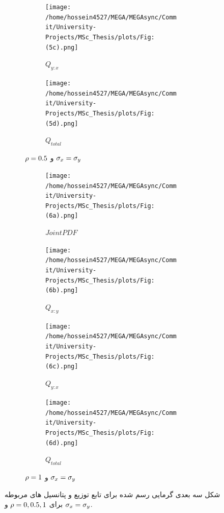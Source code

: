 \documentclass[a4paper,titlepage,12pt,fleqn,oneside]{report}
\begin{document}
\begin{figure}[tbp]
\begin{subfigure}[b]{\textwidth}
  		\hfill
  		\begin{subfigure}[b]{0.24\textwidth}
  			\renewcommand\thesubfigure{iii}
  			\centering
  			\texttt{[image: /home/hossein4527/MEGA/MEGAsync/Commit/University-Projects/MSc\_Thesis/plots/Fig:(5c).png]}
  			\caption{$Q_{y:x}$}
  			\label{fig:2.2.3}
  		\end{subfigure}
  		\hfill
  		\begin{subfigure}[b]{0.24\textwidth}
  			\renewcommand\thesubfigure{iv}
  			\centering
  			\texttt{[image: /home/hossein4527/MEGA/MEGAsync/Commit/University-Projects/MSc\_Thesis/plots/Fig:(5d).png]}
  			\caption{$Q_{total}$}
  			\label{fig:2.2.4}
  		\end{subfigure}
  		\caption{$\protect\rho =0.5$ و $\protect\sigma _{x}=\protect\sigma _{y}$}
  		\label{fig:2.2}
  	\end{subfigure}
  	\begin{subfigure}[b]{\textwidth}
  		\renewcommand\thesubfigure{c}
  		\begin{subfigure}[b]{0.24\textwidth}
  			\renewcommand\thesubfigure{i}
  			\centering
  			\texttt{[image: /home/hossein4527/MEGA/MEGAsync/Commit/University-Projects/MSc\_Thesis/plots/Fig:(6a).png]}
  			\caption{$Joint PDF$}
  			\label{fig:2.3.1}
  		\end{subfigure}
  		\hfill
  		\begin{subfigure}[b]{0.24\textwidth}
  			\renewcommand\thesubfigure{ii}
  			\centering
  			\texttt{[image: /home/hossein4527/MEGA/MEGAsync/Commit/University-Projects/MSc\_Thesis/plots/Fig:(6b).png]}
  			\caption{$Q_{x:y}$}
  			\label{fig:2.3.2}
  		\end{subfigure}
  		\hfill
  		\begin{subfigure}[b]{0.24\textwidth}
  			\renewcommand\thesubfigure{iii}
  			\centering
  			\texttt{[image: /home/hossein4527/MEGA/MEGAsync/Commit/University-Projects/MSc\_Thesis/plots/Fig:(6c).png]}
  			\caption{$Q_{y:x}$}
  			\label{fig:2.3.3}
  		\end{subfigure}
  		\hfill
  		\begin{subfigure}[b]{0.24\textwidth}
  			\renewcommand\thesubfigure{iv}
  			\centering
  			\texttt{[image: /home/hossein4527/MEGA/MEGAsync/Commit/University-Projects/MSc\_Thesis/plots/Fig:(6d).png]}
  			\caption{$Q_{total}$}
  			\label{fig:2.3.4}
  		\end{subfigure}		
  		\caption{$\protect\rho =1$ و $\protect\sigma _{x}=\protect\sigma _{y}$}
  		\label{fig:2.3}
  	\end{subfigure}
  	\caption{شکل سه بعدی گرمایی رسم شده برای تابع توزیع و پتانسیل های مربوطه برای
  		 $\protect\rho =0,0.5,1$ و $\protect\sigma _{x}=\protect\sigma %
  		_{y}$.}
  	\label{fig:2t}
  \end{figure}
\end{document}
